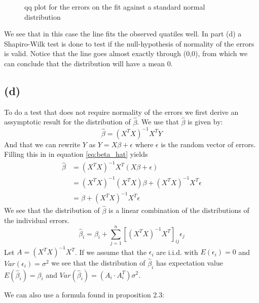 \documentclass[a4paper]{article}
\begin{document}
\begin{figure}[H]
	\centering
	
	\caption{qq plot for the errors on the fit against a standard normal distribution}
	\label{fig:qqplot-1c}
\end{figure}
We see that in this case the line fits the observed quatiles well. In part (d) a Shapiro-Wilk test is done to test if the null-hypothesis of normality of the errors is valid. Notice that the line goes almost exactly through (0,0), from which we can conclude that the distribution will have a mean $0$.

\subsection*{(d)}
\noindent {}

To do a test that does not require normality of the errors we first derive an assymptotic result for the distribution of $\hat{\beta}$.
We use that $\hat{\beta}$ is given by:
\begin{equation}
	\hat{\beta} = (X^TX)^{-1} X^TY
	\label{eq:beta_hat}
\end{equation}
And that we can rewrite $Y$ as $Y=X\beta + \epsilon$ where $\epsilon$ is the random vector of errors. Filling this in in equation \ref{eq:beta_hat} yields
\begin{align*}
	\hat{\beta} &= (X^TX)^{-1} X^T (X\beta + \epsilon)\\
		    &= (X^TX)^{-1} (X^TX) \beta + (X^TX)^{-1}X^T\epsilon\\
		    &= \beta + (X^TX)^{-1}X^T\epsilon
\end{align*}
We see that the distribution of $\hat{\beta}$ is a linear combination of the distributions of the individual errors.
\begin{equation*}
	\hat{\beta}_i = \beta_i + \sum_{j=1}^{n}[(X^TX)^{-1}X^T]_{ij} \epsilon_j
\end{equation*}
Let $A = (X^TX)^{-1}X^T$. If we assume that the $\epsilon_i$ are i.i.d. with $E(\epsilon_i)=0$ and $Var(\epsilon_i)=\sigma^2$ we see that the distribution of $\hat{\beta}_i$ has expectation value $E(\hat{\beta}_i)=\beta_i$ and $Var(\hat{\beta}_i) = (A_i \cdot A_i^T) \sigma^2$. 

We can also use a formula found in \cite{flinn} proposition 2.3:
\end{document}
